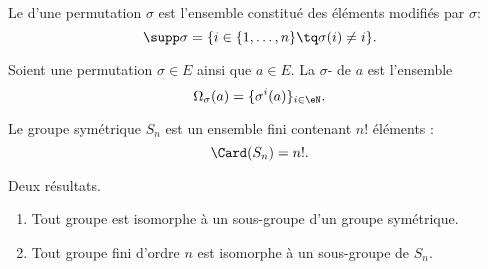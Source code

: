\begin{definition}      \label{DEFooSupportPermutation}
	Le  d'une permutation \( \sigma\) est l'ensemble constitué des éléments modifiés par \( \sigma\):
	\begin{equation*}
		\supp \sigma = \{ i \in \{1,\ldots,n \} \tq \sigma(i) \neq i\}.
	\end{equation*}
\end{definition}

\begin{definition}      \label{DEFooMVFKooMpXMQy}
	Soient une permutation \( \sigma\in E\) ainsi que \( a\in E\). La \( \sigma\)- de \( a\) est l'ensemble
	\begin{equation}
		\Omega_{\sigma}(a)=\{ \sigma^i(a) \}_{i\in \eN}.
	\end{equation}
\end{definition}

\begin{lemma}        \label{LEMooSGWKooKFIDyT}
	Le groupe symétrique \( S_n\) est un ensemble fini contenant \( n!\) éléments :
	\begin{equation}
		\Card(S_n)=n!.
	\end{equation}
\end{lemma}

\begin{lemma}        \label{LEMooUPBOooWbwMTx}
	Deux résultats.
	\begin{enumerate}
		\item
		      Tout groupe est isomorphe à un sous-groupe d'un groupe symétrique.
		\item
		      Tout groupe fini d'ordre \( n\) est isomorphe à un sous-groupe de \( S_n\).
	\end{enumerate}
\end{lemma}

